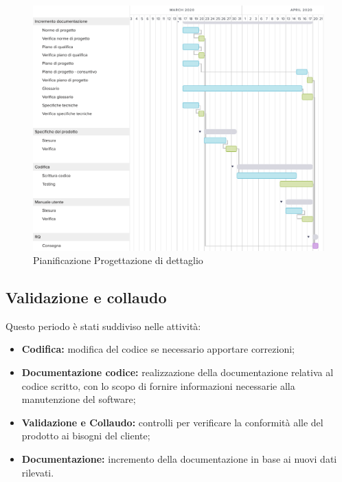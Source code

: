 \begin{figure}[h!]
	\includegraphics[width=\textwidth]{res/img/g4}
	\caption{Pianificazione Progettazione di dettaglio}
\end{figure}
\subsection{Validazione e collaudo}
Questo periodo è stati suddiviso nelle attività:
\begin{itemize}
	\item \textbf{Codifica:} modifica del codice se necessario apportare correzioni;
	\item \textbf{Documentazione codice:} realizzazione della documentazione relativa al codice scritto, con lo scopo di fornire informazioni necessarie alla manutenzione del software;
	\item \textbf{Validazione e Collaudo:} controlli per verificare la conformità alle del prodotto ai bisogni del cliente;
	\item \textbf{Documentazione:} incremento della documentazione in base ai nuovi dati rilevati.
\end{itemize}
